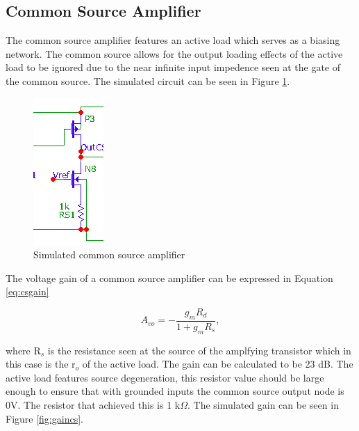 \subsection{Common Source Amplifier}

The common source amplifier features an active load which serves as a biasing network. The common source allows for the output loading effects of the active load to be ignored due to the near infinite input impedence seen at the gate of the common source. The simulated circuit can be seen in Figure \ref{fig:simcs}.

\begin{figure}[H]
	\begin{center}
		\includegraphics[scale=.30]{Simulations/simcs.png}
		\caption{Simulated common source amplifier}
		\label{fig:simcs}
	\end{center}
\end{figure} 

The voltage gain of a common source amplifier can be expressed in Equation \ref{eq:csgain}


\begin{equation}
A_{vo} = -\frac{g_mR_d}{1+g_mR_s},
\label{eqn:csgain}
\end{equation}

where R$_s$ is the resistance seen at the source of the amplfying transistor which in this case is the r$_o$ of the active load. The gain can be calculated to be 23 dB. The active load features source degeneration, this resistor value should be large enough to ensure that with grounded inputs the common source output node is 0V. The resistor that achieved this is 1 k$\Omega$. The simulated gain can be seen in Figure \ref{fig:gaincs}.


